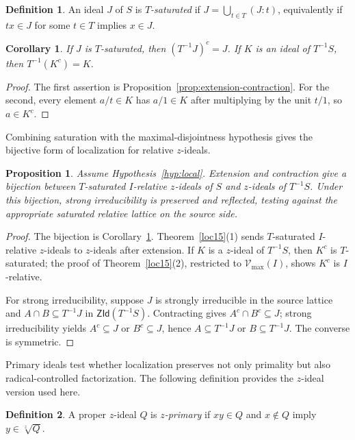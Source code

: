 \documentclass[11pt,leqno]{amsart}
\theoremstyle{plain}
\newtheorem{proposition}[theorem]{Proposition}
\newtheorem{corollary}[theorem]{Corollary}
\theoremstyle{definition}
\newtheorem{definition}{Definition}[section]
\theoremstyle{remark}
\numberwithin{equation}{section}
\newcommand{\ZId}{\mathsf{ZId}}
\begin{document}
\begin{definition}\label{def:T-saturated}
An ideal $J$ of $S$ is \emph{$T$-saturated} if
$J=\bigcup_{t\in T}(J:t)$,
equivalently if $tx\in J$ for some $t\in T$ implies $x\in J$.
\end{definition}

\begin{corollary}\label{cor:local-contraction-extension}
If $J$ is $T$-saturated, then $(T^{-1}J)^c=J$.
If $K$ is an ideal of $T^{-1}S$, then $T^{-1}(K^c)=K$.
\end{corollary}
\begin{proof}
The first assertion is Proposition~\ref{prop:extension-contraction}.
For the second, every element $a/t\in K$ has $a/1\in K$
after multiplying by the unit $t/1$, so $a\in K^c$.
\end{proof}

Combining saturation with the maximal-disjointness hypothesis
gives the bijective form of localization for relative $z$-ideals.

\begin{proposition}\label{loc19}
Assume Hypothesis~\ref{hyp:local}.  Extension and contraction give
a bijection between $T$-saturated $I$-relative $z$-ideals of $S$
and $z$-ideals of $T^{-1}S$.
Under this bijection, strong irreducibility is preserved and
reflected, testing against the appropriate saturated relative lattice
on the source side.
\end{proposition}
\begin{proof}
The bijection is Corollary~\ref{cor:local-contraction-extension}.
Theorem~\ref{loc15}(1) sends $T$-saturated $I$-relative $z$-ideals
to $z$-ideals after extension.
If $K$ is a $z$-ideal of $T^{-1}S$, then $K^c$ is $T$-saturated;
the proof of Theorem~\ref{loc15}(2), restricted to $\mathcal{V}_{\max}(I)$,
shows $K^c$ is $I$-relative.

For strong irreducibility, suppose $J$ is strongly irreducible in
the source lattice and $A\cap B\subseteq T^{-1}J$ in $\ZId(T^{-1}S)$.
Contracting gives $A^c\cap B^c\subseteq J$;
strong irreducibility yields $A^c\subseteq J$ or $B^c\subseteq J$,
hence $A\subseteq T^{-1}J$ or $B\subseteq T^{-1}J$.
The converse is symmetric.
\end{proof}

Primary ideals test whether localization preserves not only primality
but also radical-controlled factorization.
The following definition provides the $z$-ideal version used here.

\begin{definition}\label{def:zprimary}
A proper $z$-ideal $Q$ is \emph{$z$-primary} if $xy\in Q$ and
$x\notin Q$ imply $y\in\sqrt[z]{Q}$.
\end{definition}
\end{document}
